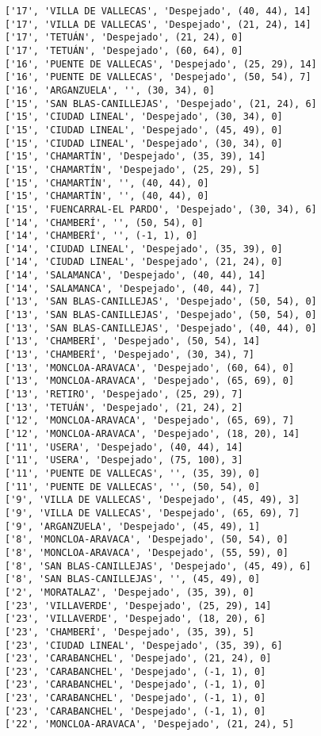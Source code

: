 \documentclass[11pt]{article}
\begin{document}
\begin{Verbatim}[commandchars=\\\{\}]
['17', 'VILLA DE VALLECAS', 'Despejado', (40, 44), 14]
['17', 'VILLA DE VALLECAS', 'Despejado', (21, 24), 14]
['17', 'TETUÁN', 'Despejado', (21, 24), 0]
['17', 'TETUÁN', 'Despejado', (60, 64), 0]
['16', 'PUENTE DE VALLECAS', 'Despejado', (25, 29), 14]
['16', 'PUENTE DE VALLECAS', 'Despejado', (50, 54), 7]
['16', 'ARGANZUELA', '', (30, 34), 0]
['15', 'SAN BLAS-CANILLEJAS', 'Despejado', (21, 24), 6]
['15', 'CIUDAD LINEAL', 'Despejado', (30, 34), 0]
['15', 'CIUDAD LINEAL', 'Despejado', (45, 49), 0]
['15', 'CIUDAD LINEAL', 'Despejado', (30, 34), 0]
['15', 'CHAMARTÍN', 'Despejado', (35, 39), 14]
['15', 'CHAMARTÍN', 'Despejado', (25, 29), 5]
['15', 'CHAMARTÍN', '', (40, 44), 0]
['15', 'CHAMARTÍN', '', (40, 44), 0]
['15', 'FUENCARRAL-EL PARDO', 'Despejado', (30, 34), 6]
['14', 'CHAMBERÍ', '', (50, 54), 0]
['14', 'CHAMBERÍ', '', (-1, 1), 0]
['14', 'CIUDAD LINEAL', 'Despejado', (35, 39), 0]
['14', 'CIUDAD LINEAL', 'Despejado', (21, 24), 0]
['14', 'SALAMANCA', 'Despejado', (40, 44), 14]
['14', 'SALAMANCA', 'Despejado', (40, 44), 7]
['13', 'SAN BLAS-CANILLEJAS', 'Despejado', (50, 54), 0]
['13', 'SAN BLAS-CANILLEJAS', 'Despejado', (50, 54), 0]
['13', 'SAN BLAS-CANILLEJAS', 'Despejado', (40, 44), 0]
['13', 'CHAMBERÍ', 'Despejado', (50, 54), 14]
['13', 'CHAMBERÍ', 'Despejado', (30, 34), 7]
['13', 'MONCLOA-ARAVACA', 'Despejado', (60, 64), 0]
['13', 'MONCLOA-ARAVACA', 'Despejado', (65, 69), 0]
['13', 'RETIRO', 'Despejado', (25, 29), 7]
['13', 'TETUÁN', 'Despejado', (21, 24), 2]
['12', 'MONCLOA-ARAVACA', 'Despejado', (65, 69), 7]
['12', 'MONCLOA-ARAVACA', 'Despejado', (18, 20), 14]
['11', 'USERA', 'Despejado', (40, 44), 14]
['11', 'USERA', 'Despejado', (75, 100), 3]
['11', 'PUENTE DE VALLECAS', '', (35, 39), 0]
['11', 'PUENTE DE VALLECAS', '', (50, 54), 0]
['9', 'VILLA DE VALLECAS', 'Despejado', (45, 49), 3]
['9', 'VILLA DE VALLECAS', 'Despejado', (65, 69), 7]
['9', 'ARGANZUELA', 'Despejado', (45, 49), 1]
['8', 'MONCLOA-ARAVACA', 'Despejado', (50, 54), 0]
['8', 'MONCLOA-ARAVACA', 'Despejado', (55, 59), 0]
['8', 'SAN BLAS-CANILLEJAS', 'Despejado', (45, 49), 6]
['8', 'SAN BLAS-CANILLEJAS', '', (45, 49), 0]
['2', 'MORATALAZ', 'Despejado', (35, 39), 0]
['23', 'VILLAVERDE', 'Despejado', (25, 29), 14]
['23', 'VILLAVERDE', 'Despejado', (18, 20), 6]
['23', 'CHAMBERÍ', 'Despejado', (35, 39), 5]
['23', 'CIUDAD LINEAL', 'Despejado', (35, 39), 6]
['23', 'CARABANCHEL', 'Despejado', (21, 24), 0]
['23', 'CARABANCHEL', 'Despejado', (-1, 1), 0]
['23', 'CARABANCHEL', 'Despejado', (-1, 1), 0]
['23', 'CARABANCHEL', 'Despejado', (-1, 1), 0]
['23', 'CARABANCHEL', 'Despejado', (-1, 1), 0]
['22', 'MONCLOA-ARAVACA', 'Despejado', (21, 24), 5]

\end{Verbatim}
\end{document}
